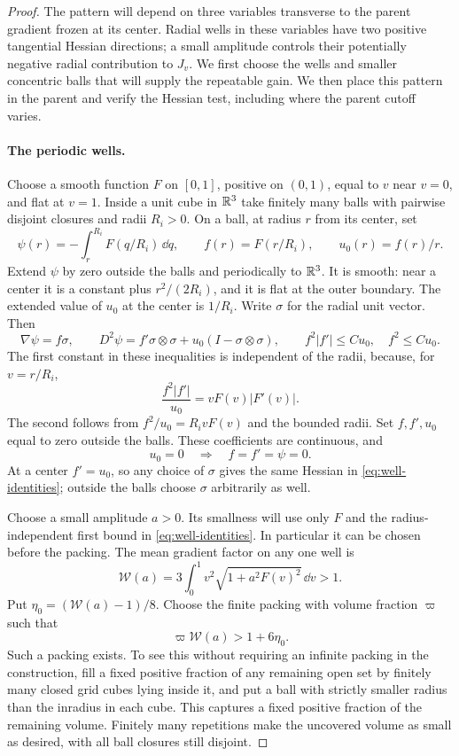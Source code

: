 \begin{proof}
The pattern will depend on three variables transverse to the parent
gradient frozen at its center.  Radial wells in these variables have
two positive tangential Hessian directions; a small amplitude controls
their potentially negative radial contribution to $J_v$.  We first
choose the wells and smaller concentric balls that will supply the
repeatable gain.  We then place this pattern in the parent and verify
the Hessian test, including where the parent cutoff varies.

\paragraph{The periodic wells.}
Choose a smooth function $F$ on $[0,1]$, positive on $(0,1)$, equal
to $v$ near $v=0$, and flat at $v=1$.  Inside a unit cube in $\mathbb R^3$
take finitely many balls with pairwise disjoint closures and radii
$R_i>0$.  On a ball, at radius $r$ from its center, set
\[
 \psi(r)=-\int_r^{R_i}F(q/R_i)\,\dd q,\qquad
 f(r)=F(r/R_i),\qquad u_0(r)=f(r)/r.
\]
Extend $\psi$ by zero outside the balls and periodically to $\mathbb R^3$.
It is smooth: near a center it is a constant plus $r^2/(2R_i)$,
and it is flat at the outer boundary.  The extended value of $u_0$
at the center is $1/R_i$.  Write $\sigma$ for the radial unit vector.
Then
\begin{equation}\label{eq:well-identities}
 \nabla\psi=f\sigma,\qquad
 D^2\psi=f'\sigma\otimes\sigma
              +u_0(I-\sigma\otimes\sigma),\qquad
 f^2|f'|\le C u_0,\quad f^2\le C u_0.
\end{equation}
The first constant in these inequalities is independent of the radii,
because, for $v=r/R_i$,
\[
 \frac{f^2|f'|}{u_0}=vF(v)|F'(v)|.
\]
The second follows from $f^2/u_0=R_i vF(v)$ and the bounded radii.
Set $f,f',u_0$ equal to zero outside the balls.  These coefficients
are continuous, and
\begin{equation}\label{eq:well-vanishing}
 u_0=0\quad\Longrightarrow\quad f=f'=\psi=0.
\end{equation}
At a center $f'=u_0$, so any choice of $\sigma$ gives the same
Hessian in \eqref{eq:well-identities}; outside the balls choose
$\sigma$ arbitrarily as well.

Choose a small amplitude $a>0$.  Its smallness will use only $F$ and
the radius-independent first bound in \eqref{eq:well-identities}.
In particular it can be chosen before the packing.  The mean gradient
factor on any one well is
\[
 \mathcal W(a)=3\int_0^1v^2\sqrt{1+a^2F(v)^2}\,\dd v>1.
\]
Put $\eta_0=(\mathcal W(a)-1)/8$.  Choose the finite packing with
volume fraction $\varpi$ such that
\[
 \varpi\mathcal W(a)>1+6\eta_0.
\]
Such a packing exists.  To see this without requiring an infinite
packing in the construction, fill a fixed positive fraction of any
remaining open set by finitely many closed grid cubes lying inside
it, and put a ball with strictly smaller radius than the inradius
in each cube.  This captures a fixed positive fraction of the
remaining volume.  Finitely many repetitions make the uncovered
volume as small as desired, with all ball closures still disjoint.


\end{proof}
